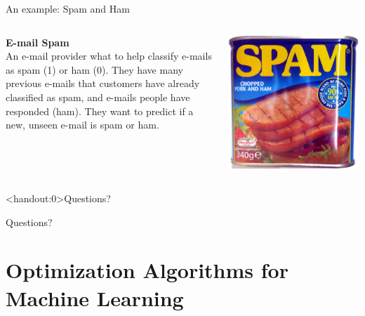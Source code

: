 \documentclass[10pt,handout]{beamer}
\begin{document}
\begin{frame}{An example: Spam and Ham}

\begin{columns}
	\begin{column}{0.47\textwidth}
		\textbf{E-mail Spam}\\
An e-mail provider what to help classify e-mails as spam (1) or ham (0). They have many previous e-mails that customers have already classified as spam, and e-mails people have responded (ham). They want to predict if a new, unseen e-mail is spam or ham.
	\end{column}
	\begin{column}{0.5\textwidth}
		\includegraphics[width=\textwidth]{figs/spam.jpg}
	\end{column}
\end{columns}
\end{frame}


\begin{frame}<handout:0>{Questions?}

Questions?

\end{frame}



\section{Optimization Algorithms for Machine Learning}
\frame{\sectionpage}
\end{document}
